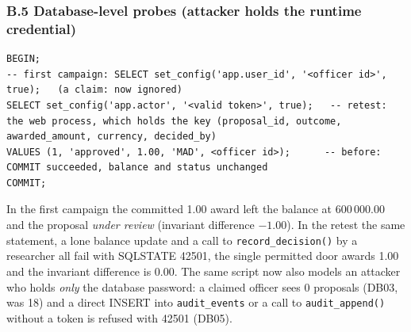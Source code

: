 \documentclass[10pt,a4paper]{article}
\newcommand{\code}[1]{\nolinkurl{#1}}
\begin{document}
\subsubsection*{B.5 Database-level probes (attacker holds the runtime credential)}
\begin{lstlisting}[language=SQLx,caption={F01 probe, as grants\_app on grants\_test (first campaign: committed; retest: refused with 42501)}]
BEGIN;
-- first campaign: SELECT set_config('app.user_id', '<officer id>', true);   (a claim: now ignored)
SELECT set_config('app.actor', '<valid token>', true);   -- retest: the web process, which holds the key (proposal_id, outcome, awarded_amount, currency, decided_by)
VALUES (1, 'approved', 1.00, 'MAD', <officer id>);      -- before: COMMIT succeeded, balance and status unchanged
COMMIT;
\end{lstlisting}
In the first campaign the committed 1.00 award left the balance at 600\,000.00 and the proposal \emph{under review} (invariant difference $-1.00$). In the retest the same statement, a lone balance update and a call to \code{record_decision()} by a researcher all fail with SQLSTATE 42501, the single permitted door awards 1.00 and the invariant difference is 0.00. The same script now also models an attacker who holds \emph{only} the database password: a claimed officer sees 0 proposals (DB03, was 18) and a direct INSERT into \code{audit\_events} or a call to \code{audit\_append()} without a token is refused with 42501 (DB05).
\end{document}
